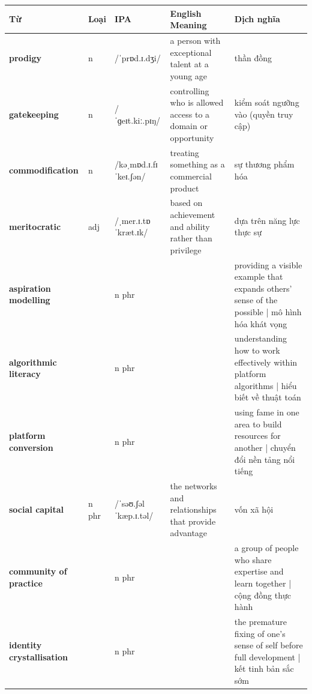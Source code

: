 \separator


\vspace{0.8em}
\begin{center}
\renewcommand{\arraystretch}{1.65}
\begin{tabularx}{\textwidth}{|V{0.22\textwidth}|C{0.07\textwidth}|I{0.20\textwidth}|Y|V{0.18\textwidth}|}
\hline
{}
\textbf{Từ} & \textbf{Loại} & \textbf{IPA} & \textbf{English Meaning} & \textbf{Dịch nghĩa} \\
\hline
\textbf{prodigy} & n & /ˈprɒd.ɪ.dʒi/ & a person with exceptional talent at a young age & thần đồng \\ \hline
\textbf{gatekeeping} & n & /ˈɡeɪt.kiː.pɪŋ/ & controlling who is allowed access to a domain or opportunity & kiểm soát ngưỡng vào (quyền truy cập) \\ \hline
\textbf{commodification} & n & /kəˌmɒd.ɪ.fɪˈkeɪ.ʃən/ & treating something as a commercial product & sự thương phẩm hóa \\ \hline
\textbf{meritocratic} & adj & /ˌmer.ɪ.tɒˈkræt.ɪk/ & based on achievement and ability rather than privilege & dựa trên năng lực thực sự \\ \hline
\textbf{aspiration modelling} & & n phr & & providing a visible example that expands others' sense of the possible | mô hình hóa khát vọng \\ \hline
\textbf{algorithmic literacy} & & n phr & & understanding how to work effectively within platform algorithms | hiểu biết về thuật toán \\ \hline
\textbf{platform conversion} & & n phr & & using fame in one area to build resources for another | chuyển đổi nền tảng nổi tiếng \\ \hline
\textbf{social capital} & n phr & /ˈsəʊ.ʃəl ˈkæp.ɪ.təl/ & the networks and relationships that provide advantage & vốn xã hội \\ \hline
\textbf{community of practice} & & n phr & & a group of people who share expertise and learn together | cộng đồng thực hành \\ \hline
\textbf{identity crystallisation} & & n phr & & the premature fixing of one's sense of self before full development | kết tinh bản sắc sớm \\ \hline
\end{tabularx}
\end{center}

\newpage

